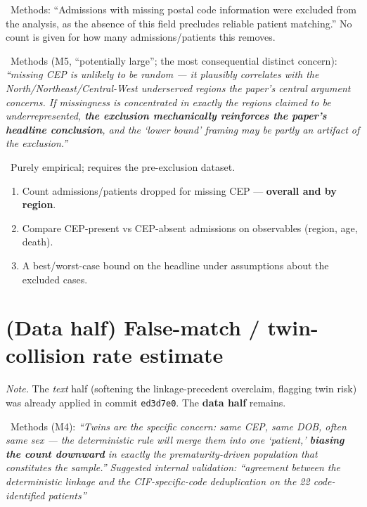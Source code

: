 \documentclass[11pt,a4paper]{article}
\newenvironment{papersays}%
  {\def\FrameCommand{{\color{rulegray}\vrule width 1.5pt}\hspace{6pt}%
     \colorbox{paperbg}}%
   \MakeFramed{\advance\hsize-\width \FrameRestore}\small}%
  {\endMakeFramed}
\newenvironment{refereesays}%
  {\def\FrameCommand{{\color{rulegray}\vrule width 1.5pt}\hspace{6pt}%
     \colorbox{refbg}}%
   \MakeFramed{\advance\hsize-\width \FrameRestore}\small\itshape}%
  {\endMakeFramed}
\begin{document}
\papersaysHead\ Methods:
\begin{papersays}
``Admissions with missing postal code information were excluded from the analysis, as the
absence of this field precludes reliable patient matching.''
\end{papersays}
No count is given for how many admissions/patients this removes.

\ Methods (M5, ``potentially large''; the most consequential distinct concern):
\begin{refereesays}
``missing CEP is unlikely to be random --- it plausibly correlates with the
North/Northeast/Central-West underserved regions the paper's central argument concerns. If
missingness is concentrated in exactly the regions claimed to be underrepresented,
\textbf{the exclusion mechanically reinforces the paper's headline conclusion}, and the
`lower bound' framing may be partly an artifact of the exclusion.''
\end{refereesays}

\whyHead\ Purely empirical; requires the pre-exclusion dataset.

\opHead
\begin{enumerate}[leftmargin=*, topsep=2pt]
  \item Count admissions/patients dropped for missing CEP --- \textbf{overall and by region}.
  \item Compare CEP-present vs CEP-absent admissions on observables (region, age, death).
  \item A best/worst-case bound on the headline under assumptions about the excluded cases.
\end{enumerate}

\section{(Data half) False-match / twin-collision rate estimate}

\textit{Note.} The \textit{text} half (softening the linkage-precedent overclaim, flagging twin
risk) was already applied in commit \texttt{ed3d7e0}. The \textbf{data half} remains.

\ Methods (M4):
\begin{refereesays}
``Twins are the specific concern: same CEP, same DOB, often same sex --- the deterministic rule
will merge them into one `patient,' \textbf{biasing the count downward} in exactly the
prematurity-driven population that constitutes the sample.''
\end{refereesays}
Suggested internal validation:
\begin{refereesays}
``agreement between the deterministic linkage and the CIF-specific-code deduplication on the
22 code-identified patients''
\end{refereesays}
\end{document}
